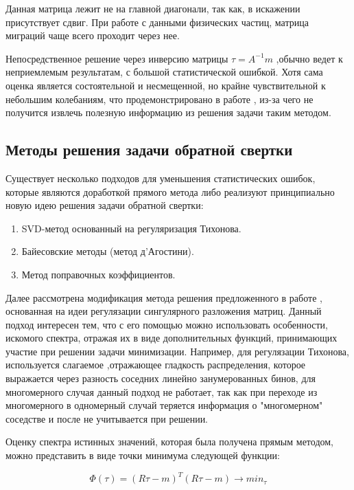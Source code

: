 \documentclass[a4paper,12pt]{diplom}
\begin{document}
Данная матрица лежит не на главной диагонали, так как, в искажении присутствует сдвиг. При работе с данными физических частиц, 
матрица миграций чаще всего проходит через нее.

Непосредственное решение через инверсию матрицы $\tau = A^{-1} m$ ,обычно ведет к неприемлемым результатам, с большой статистической
ошибкой. Хотя сама оценка является состоятельной и несмещенной, но крайне чувствительной к небольшим колебаниям, что продемонстрировано 
в работе \cite{SvdHocker}, из-за чего не получится извлечь полезную информацию из решения задачи таким методом.


\subsection*{Методы решения задачи обратной свертки}

Существует несколько подходов для уменьшения статистических ошибок, которые являются доработкой прямого метода либо реализуют принципиально
новую идею решения задачи обратной свертки:
\begin{enumerate}
\item SVD-метод основанный на регуляризация Тихонова.
\item Байесовские методы (метод д’Агостини).
\item Метод поправочных коэффициентов.
\end{enumerate}

Далее рассмотрена модификация метода решения предложенного в работе \cite{SvdBogomolov}, основанная на идеи регулязации сингулярного разложения 
матриц. Данный подход интересен тем, что с его помощью можно использовать особенности, искомого спектра, отражая их в виде дополнительных функций, 
принимающих участие при решении задачи минимизации. Например, для регулязации Тихонова, используется слагаемое ,отражающее гладкость 
распределения, которое выражается через разность соседних линейно занумерованных бинов, для многомерного случая данный подход не работает, 
так как при переходе из многомерного в одномерный случай теряется информация о "многомерном" соседстве и после не учитывается при решении.

Оценку спектра истинных значений, которая была получена прямым методом, можно представить в виде точки минимума следующей функции: 

\begin{equation}
   \Phi(\tau)=(R\tau-m)^T (R\tau-m) \to min_{\tau}
   \label{min_base}
\end{equation}
\end{document}
